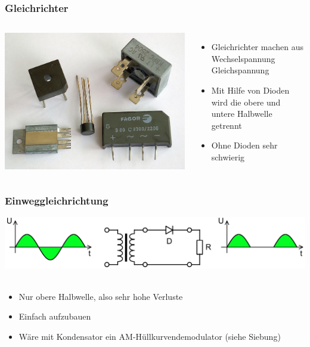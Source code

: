 \begin{frame}
    \frametitle{Gleichrichter}
    \begin{columns}[c]
        \begin{center}
            \includegraphics[width=1\textwidth,height=.85\textheight,keepaspectratio]{a05/Brueckengleichrichter_Bilder.jpg}\\
            \tiny \hyperlink{refs}{\cite{wm}}
        \end{center}
    \begin{itemize}
			\item Gleichrichter machen aus Wechselspannung Gleichspannung
			\item Mit Hilfe von Dioden wird die obere und untere Halbwelle getrennt
			\item Ohne Dioden sehr schwierig
    \end{itemize}
    \end{columns}
\end{frame}

\begin{frame}
    \frametitle{Einweggleichrichtung}
    \begin{center}
        \includegraphics[width=1\textwidth,height=.6\textheight,keepaspectratio]{a05/Halfwave_rectifier.png}\\
        \tiny \hyperlink{refs}{\cite{wm}} \\[1em] \large
        \begin{itemize}
			\item Nur obere Halbwelle, also sehr hohe Verluste
			\item Einfach aufzubauen
			\item Wäre mit Kondensator ein AM-Hüllkurvendemodulator (siehe Siebung)
    	\end{itemize}
 	\end{center}
\end{frame}

